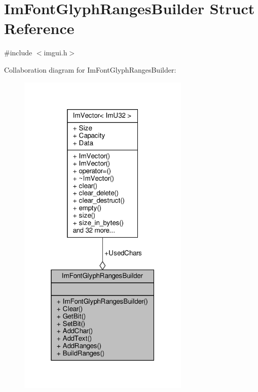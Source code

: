 \hypertarget{structImFontGlyphRangesBuilder}{}\section{Im\+Font\+Glyph\+Ranges\+Builder Struct Reference}
\label{structImFontGlyphRangesBuilder}


{\ttfamily \#include $<$imgui.\+h$>$}



Collaboration diagram for Im\+Font\+Glyph\+Ranges\+Builder\+:
\nopagebreak
\begin{figure}[H]
\begin{center}
\leavevmode
\includegraphics[width=232pt]{structImFontGlyphRangesBuilder__coll__graph}
\end{center}
\end{figure}

